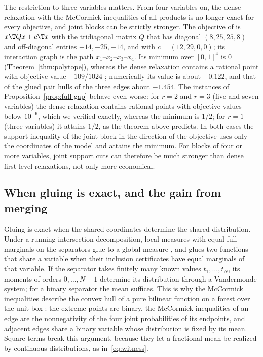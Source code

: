 The restriction to three variables matters. From four variables on, the dense
relaxation with the McCormick inequalities of all products is no longer exact
for every objective, and joint blocks can be strictly stronger. The objective of
\citet[Example~4]{BurerNatarajanWillemsen2025} is $x\T Qx+c\T x$ with the
tridiagonal matrix $Q$ that has diagonal $(8,25,25,8)$ and off-diagonal
entries $-14,-25,-14$, and with $c=(12,29,0,0)$; its interaction graph is the
path $x_1$--$x_2$--$x_3$--$x_4$. Its minimum over $[0,1]^4$ is $0$
(Theorem~\ref{thm:polytope}), whereas the dense relaxation contains a rational
point with objective value $-109/1024$ \citep[Section~6.4]{BurerNatarajanWillemsen2025};
numerically its value is about $-0.122$, and that of the glued pair hulls of
the three edges about $-1.454$. The instances of Proposition~\ref{prop:full-gap}
behave even worse: for $r=2$ and $r=3$ (five and seven variables) the dense
relaxation contains rational points with objective values below $10^{-6}$,
which we verified exactly, whereas the minimum is $1/2$; for $r=1$ (three
variables) it attains $1/2$, as the theorem above predicts. In both cases the
support inequality of the joint block in the direction of the objective uses
only the coordinates of the model and attains the minimum. For blocks of four
or more variables, joint support cuts can therefore be much stronger than dense
first-level relaxations, not only more economical.

\subsection{When gluing is exact, and the gain from merging}\label{sec:gluing}

Gluing is exact when the shared coordinates determine the shared
distribution. Under a running-intersection decomposition, local measures
with equal full marginals on the separators glue to a global measure
\citep{Vorobev1962,Lasserre2006}, and \citet[Corollary~3.10]{Tawarmalani2010}
glues two functions that share a variable when their inclusion certificates
have equal marginals of that variable. If the separator takes finitely many
known values $t_1,\dots,t_N$, its moments of orders $0,\dots,N-1$ determine
its distribution through a Vandermonde system; for a binary separator the
mean suffices. This is why the McCormick inequalities describe the convex
hull of a pure bilinear function on a forest over the unit box
\citep[Proposition~8]{Padberg1989}: the extreme points are binary, the
McCormick inequalities of an edge are the nonnegativity of the four joint
probabilities of its endpoints, and adjacent edges share a binary variable
whose distribution is fixed by its mean. Square terms break this argument,
because they let a fractional mean be realized by continuous distributions,
as in~\eqref{eq:witness}.

